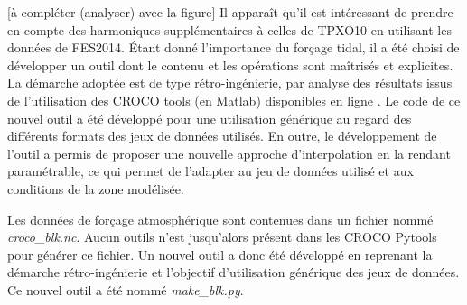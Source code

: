 \documentclass[10pt,a4paper,titlepage]{article}
\begin{document}
\alert{[à compléter (analyser) avec la figure]}
Il apparaît qu'il est intéressant de prendre en compte des harmoniques supplémentaires à celles de TPXO10 en utilisant les données de FES2014.
Étant donné l'importance du forçage tidal, il a été choisi de développer un outil dont le contenu et les opérations sont maîtrisés et explicites.
La démarche adoptée est de type rétro-ingénierie, par analyse des résultats issus de l'utilisation des CROCO tools (en Matlab) disponibles en ligne \parencite{croco_files_examples}.
Le code de ce nouvel outil a été développé pour une utilisation générique au regard des différents formats des jeux de données utilisés.
En outre, le développement de l'outil a permis de proposer une nouvelle approche d'interpolation en la rendant paramétrable, ce qui permet de l'adapter au jeu de données utilisé et aux conditions de la zone modélisée.

Les données de forçage atmosphérique sont contenues dans un fichier nommé \textit{croco\_blk.nc}.
Aucun outils n'est jusqu'alors présent dans les CROCO Pytools pour générer ce fichier.
Un nouvel outil a donc été développé en reprenant la démarche rétro-ingénierie et l'objectif d'utilisation générique des jeux de données.
Ce nouvel outil a été nommé \textit{make\_blk.py}.
\end{document}
